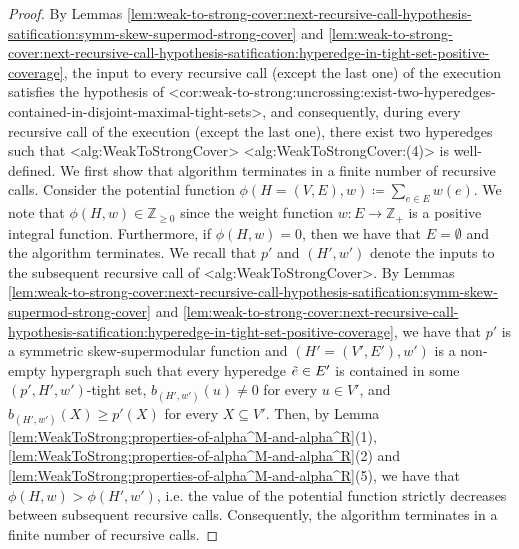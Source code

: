 \documentclass{article}
\def\Cref#1{<#1>}%
\providecommand{\Z}{\mathbb{Z}}
\begin{document}
\begin{proof}
By Lemmas \ref{lem:weak-to-strong-cover:next-recursive-call-hypothesis-satification:symm-skew-supermod-strong-cover} and \ref{lem:weak-to-strong-cover:next-recursive-call-hypothesis-satification:hyperedge-in-tight-set-positive-coverage}, the input to every recursive call (except the last one) of the execution satisfies the hypothesis of \Cref{cor:weak-to-strong:uncrossing:exist-two-hyperedges-contained-in-disjoint-maximal-tight-sets}, and consequently, during every recursive call of the execution (except the last one), there exist two hyperedges such that \Cref{alg:WeakToStrongCover} \Cref{alg:WeakToStrongCover:(4)} is well-defined.
We first show that 
algorithm terminates in a finite number of recursive calls. 
Consider the potential function $\phi(H=(V, E), w) \coloneqq  \sum_{e \in E}w(e)$. We note that $\phi(H, w) \in \Z_{\geq 0}$ since the weight function $w:E\rightarrow\Z_+$ is a positive integral function. Furthermore, if $\phi(H, w) = 0$, then we have that $E = \emptyset$ and the algorithm terminates. We recall that $p'$ and $(H', w')$ denote the inputs to the subsequent recursive call of \Cref{alg:WeakToStrongCover}. 
By Lemmas \ref{lem:weak-to-strong-cover:next-recursive-call-hypothesis-satification:symm-skew-supermod-strong-cover} and \ref{lem:weak-to-strong-cover:next-recursive-call-hypothesis-satification:hyperedge-in-tight-set-positive-coverage}, we have that $p'$ is a symmetric skew-supermodular function and $(H' = (V', E'), w')$ is a non-empty hypergraph such that every hyperedge $\Tilde{e} \in E'$ is contained in some $(p', H', w')$-tight set, $b_{(H', w')}(u) \not = 0$ for every $u \in V'$, and $b_{(H', w')}(X) \geq p'(X)$ for every $X \subseteq V'$.
Then, by Lemma \ref{lem:WeakToStrong:properties-of-alpha^M-and-alpha^R}(1), \ref{lem:WeakToStrong:properties-of-alpha^M-and-alpha^R}(2) and \ref{lem:WeakToStrong:properties-of-alpha^M-and-alpha^R}(5), we have that $\phi(H, w) > \phi(H', w')$, i.e. the value of the potential function strictly decreases between subsequent recursive calls. Consequently, the algorithm terminates in a finite number of recursive calls.



\end{proof}
\end{document}
